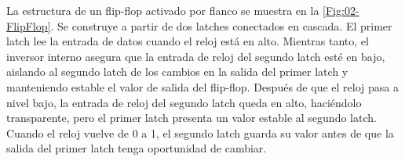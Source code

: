 La estructura de un flip-flop activado por flanco se muestra en la \cref{Fig:02-FlipFlop}. Se construye a partir de dos latches conectados en cascada. El primer latch lee la entrada de datos cuando el reloj está en alto. Mientras tanto, el inversor interno asegura que la entrada de reloj del segundo latch esté en bajo, aislando al segundo latch de los cambios en la salida del primer latch y manteniendo estable el valor de salida del flip-flop. Después de que el reloj pasa a nivel bajo, la entrada de reloj del segundo latch queda en alto, haciéndolo transparente, pero el primer latch presenta un valor estable al segundo latch. Cuando el reloj vuelve de 0 a 1, el segundo latch guarda su valor antes de que la salida del primer latch tenga oportunidad de cambiar.


